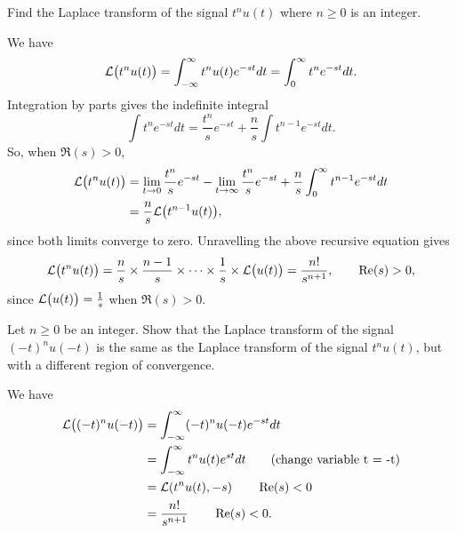 \begin{excersizelist}
\begin{solution}
\begin{center}
\end{center}
\end{solution}

\item \label{excer:laplacetransformcommonpolyut} Find the Laplace transform of the signal $t^n u(t)$ where $n\geq 0$ is an integer.
\begin{solution}
We have
\[
\mathcal L\big(t^nu(t)\big) = \int_{-\infty}^{\infty} t^nu(t) e^{-st} dt = \int_{0}^{\infty} t^n e^{-st} dt.
\]
Integration by parts gives the indefinite integral
\[
\int t^n e^{-st} dt = \frac{t^n}{s} e^{-st} + \frac{n}{s} \int t^{n-1} e^{-st} dt.
\]
So, when $\Re(s) > 0$,
\begin{align*}
\mathcal L\big(t^nu(t)\big) &= \lim_{t \to 0}\frac{t^n}{s} e^{-st} - \lim_{t \to \infty}\frac{t^n}{s} e^{-st} + \frac{n}{s} \int_{0}^\infty t^{n-1} e^{-st} dt \\
&= \frac{n}{s} \mathcal L\big(t^{n-1}u(t)\big),
\end{align*}
since both limits converge to zero.  Unravelling the above recursive equation gives
\[
\mathcal L\big(t^nu(t)\big) = \frac{n}{s}\times\frac{n-1}{s}\times\cdots\times\frac{1}{s}\times\mathcal L\big(u(t)\big) = \frac{n!}{s^{n+1}}, \qquad \operatorname{Re}(s) > 0,
\]
since $\mathcal L\big(u(t)\big) = \tfrac{1}{s}$ when $\Re(s) >0$. 
\end{solution}

\item Let $n \geq 0$ be an integer.  Show that the Laplace transform of the signal $(-t)^n u(-t)$ is the same as the Laplace transform of the signal $t^n u(t)$, but with a different region of convergence.
\begin{solution}
We have
\begin{align*}
\mathcal L\big((-t)^nu(-t)\big) &= \int_{-\infty}^{\infty} (-t)^n u(-t) e^{-st} dt \\
&= \int_{-\infty}^{\infty} t^{n} u(t) e^{st} dt \qquad \text{(change variable t = -t)} \\
&= \mathcal L( t^n u(t), -s) \qquad \operatorname{Re}(s) < 0 \\
&= \frac{n!}{s^{n+1}} \qquad \operatorname{Re}(s) < 0.
\end{align*}
\end{solution}


\end{excersizelist}
